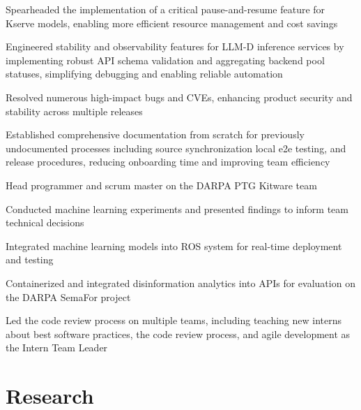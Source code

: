 \documentclass[]{deedy-resume-reversed}
\begin{document}
\begin{minipage}[t]{0.68\textwidth}
\vspace{1mm}
\location{}
\begin{tightemize}
\item Spearheaded the implementation of a critical pause-and-resume feature for Kserve models, enabling more efficient resource management and cost savings
\item Engineered stability and observability features for LLM-D inference services by implementing robust API schema validation and aggregating backend pool statuses, simplifying debugging and enabling reliable automation
\item Resolved numerous high-impact bugs and CVEs, enhancing product security and stability across multiple releases
\item Established comprehensive documentation from scratch for previously undocumented processes including source synchronization local e2e testing, and release procedures, reducing onboarding time and improving team efficiency
\end{tightemize}
\sectionsep

\begin{tightemize}
\item Head programmer and scrum master on the DARPA PTG Kitware team
\item Conducted machine learning experiments and presented findings to inform team technical decisions
\item Integrated machine learning models into ROS system for real-time deployment and testing
\item Containerized and integrated disinformation analytics into APIs for evaluation on the DARPA SemaFor project
\item Led the code review process on multiple teams, including teaching new interns about best software practices, the code review process, and agile development as the Intern
Team Leader
\end{tightemize}
\sectionsep

\section{Research}


\end{minipage}
\end{document}
